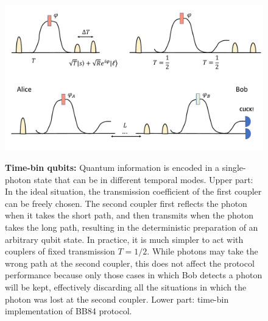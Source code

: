 \documentclass[a4paper]{article}
\begin{document}
\begin{figure}
\begin{center}
  \includegraphics[width=12cm]{Timebin.pdf}\\
  \caption{\textbf{Time-bin qubits:} Quantum information is encoded in a single-photon state that can be in different temporal modes. Upper part: In the ideal situation, the transmission coefficient of the first coupler can be freely chosen. The second coupler first reflects the photon when it takes the short path, and then transmits when the photon takes the long path, resulting in the deterministic preparation of an arbitrary qubit state. In practice, it is much simpler to act with couplers of fixed transmission $T=1/2$. While photons may take the wrong path at the second coupler, this does not affect the protocol performance because only those cases in which Bob detects a photon will be kept, effectively discarding all the situations in which the photon was lost at the second coupler.  Lower part: time-bin implementation of BB84 protocol.}\label{timebin}
\end{center}
\end{figure}
\end{document}
